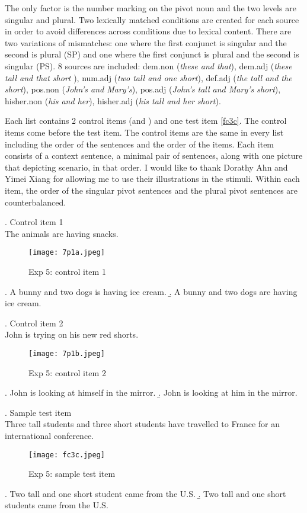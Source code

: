 \documentclass[
  11pt          %
  ,letterpaper  %
  ,center       %
  ,noupper      %
  ]{uconnthesis2}
\begin{document}
The only factor is the number marking on the pivot noun and the two levels are singular and plural. Two lexically matched conditions are created for each source in order to avoid differences across conditions due to lexical content. There are two variations of mismatches: one where the first conjunct is singular and the second is plural (SP) and one where the first conjunct is plural and the second is singular (PS). 8 sources are included: dem.non (\textit{these and that}), dem.adj (\textit{these tall and that short }), num.adj (\textit{two tall and one short}), def.adj (\textit{the tall and the short}), pos.non (\textit{John's and Mary's}), pos.adj (\textit{John's tall and Mary's short}), hisher.non (\textit{his and her}), hisher.adj (\textit{his tall and her short}). 

Each list contains 2 control items (\Next and \NNext) and one test item \ref{fc3c}. The control items come before the test item. The control items are the same in every list including the order of the sentences and the order of the items. Each item consists of a context sentence, a minimal pair of sentences, along with one picture that depicting scenario, in that order. I would like to thank Dorathy Ahn and Yimei Xiang for allowing me to use their illustrations in the stimuli. Within each item, the order of the singular pivot sentences and the plural pivot sentences are counterbalanced.

\ex. Control item 1\\
The animals are having snacks.\\
\vspace{-0.5em}
\begin{figure}[htb!] 
\texttt{[image: 7p1a.jpeg]} \centering
\caption{Exp 5: control item 1}
\label{fig:exp5a}
\end{figure}\vspace{-0.5em}
\a. A bunny and two dogs is having ice cream.
\b. A bunny and two dogs are having ice cream.

\ex. Control item 2 \\
John is trying on his new red shorts.
\begin{figure}[htb!] 
\texttt{[image: 7p1b.jpeg]} \centering
\caption{Exp 5: control item 2}
\label{fig:exp5b}
\end{figure}\vspace{-0.5em}
\a. John is looking at himself in the mirror.	
\b. John is looking at him in the mirror.

\ex.\label{fc3c} Sample test item\\
Three tall students and three short students have travelled to France for an international conference.
\vspace{-0.5em}
\begin{figure}[htb!]
\texttt{[image: fc3c.jpeg]} \centering
\caption{Exp 5: sample test item}
\label{fig:exp5c}
\end{figure}
\a. Two tall and one short student came from the U.S.
\b. Two tall and one short students came from the U.S.
\end{document}
